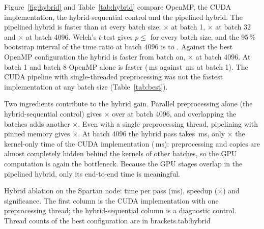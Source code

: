 Figure~\ref{fig:hybrid} and Table~\ref{tab:hybrid} compare OpenMP, the CUDA implementation, the hybrid-sequential control and the pipelined hybrid. The pipelined hybrid is faster than \cudabase{} at every batch size: $\times$ at batch 1, $\times$ at batch 32 and $\times$ at batch 4096. Welch's $t$-test gives $p\le$  for every batch size, and the 95\,\% bootstrap interval of the time ratio at batch 4096 is  to . Against the best OpenMP configuration the hybrid is faster from batch  on, $\times$ at batch 4096. At batch 1 and batch 8 OpenMP alone is faster (\,ms against \,ms at batch 1). The CUDA pipeline with single-threaded preprocessing was not the fastest implementation at any batch size (Table~\ref{tab:best}).

Two ingredients contribute to the hybrid gain. Parallel preprocessing alone (the hybrid-sequential control) gives $\times$ over \cudabase{} at batch 4096, and overlapping the batches adds another $\times$. Even with a single preprocessing thread, pipelining with pinned memory gives $\times$. At batch 4096 the hybrid pass takes \,ms, only $\times$ the kernel-only time of the CUDA implementation (\,ms): preprocessing and copies are almost completely hidden behind the kernels of other batches, so the GPU computation is again the bottleneck. Because the GPU stages overlap in the pipelined hybrid, only its end-to-end time is meaningful.


\begin{widetable}{Hybrid ablation on the Spartan node: time per pass (ms), speedup ($\times$) and significance. The first column is the CUDA implementation with one preprocessing thread; the hybrid-sequential column is a diagnostic control. Thread counts of the best configuration are in brackets.}{tab:hybrid}
\fitwide{}
\end{widetable}

